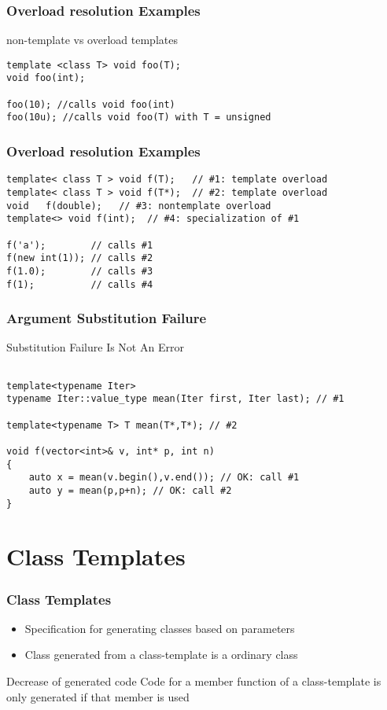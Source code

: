 \documentclass{beamer}
\begin{document}
\begin{frame}[fragile]
\frametitle{Overload resolution Examples}

\begin{block}{non-template vs overload templates}
\begin{lstlisting}
template <class T> void foo(T);
void foo(int);

foo(10); //calls void foo(int)
foo(10u); //calls void foo(T) with T = unsigned
\end{lstlisting}
\end{block}

\end{frame}

\begin{frame}[fragile]
\frametitle{Overload resolution Examples}

\begin{lstlisting}
template< class T > void f(T);   // #1: template overload
template< class T > void f(T*);  // #2: template overload
void   f(double);   // #3: nontemplate overload
template<> void f(int);  // #4: specialization of #1
 
f('a');        // calls #1
f(new int(1)); // calls #2
f(1.0);        // calls #3
f(1);          // calls #4
\end{lstlisting}
\end{frame}

\begin{frame}[fragile]
\frametitle{Argument Substitution Failure}

Substitution Failure Is Not An Error
\begin{lstlisting}

template<typename Iter> 
typename Iter::value_type mean(Iter first, Iter last); // #1

template<typename T> T mean(T*,T*); // #2

void f(vector<int>& v, int* p, int n)
{
    auto x = mean(v.begin(),v.end()); // OK: call #1
    auto y = mean(p,p+n); // OK: call #2
}

\end{lstlisting}
\end{frame}

\section{Class Templates}
\begin{frame}
\frametitle{Class Templates}

\begin{itemize}
\item Specification for generating classes based on parameters
\item Class generated from a class-template is a ordinary class
\end{itemize}

\begin{block}{Decrease of generated code}
Code for a member function of a class-template is only generated if that member is used
\end{block}

\end{frame}
\end{document}
